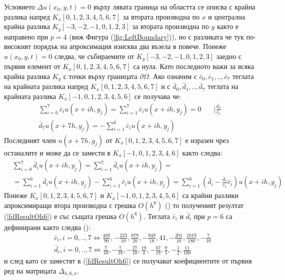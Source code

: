 \documentclass{article}
\newcommand{\rf}[1]{(\ref{#1})}
\begin{document}
Условието $\Delta u(x_0, y, t) = 0$ върху лявата граница на областта се описва с крайна разлика напред $K_x[0,1,2,3,4,5,6,7]$ за втората производна по $x$ и централна крайна разлика $K_y[-3,-2,-1,0,1,2,3]$ за втората производна по $y$ както е направено при $p=4$ (виж Фигура \rf{fig:LeftBoundary}), но с разликата че тук по-високият порядък на апроксимация изисква два възела в повече. Понеже $u(x_0, y, t) = 0$ следва, че събираемите от $K_y[-3,-2,-1,0,1,2,3]$ заедно с първия елемент от $K_x[0,1,2,3,4,5,6,7]$ са нула. Като последното важи за всяка крайна разлика $K_y$ с точки върху границата $\partial \Omega$. Ако означим с $\bar c_0, \bar c_1, .., \bar c_7$ теглата на крайната разлика напред $K_x[0,1,2,3,4,5,6,7]$ и с $\bar d_0, \bar d_1,.., \bar d_7$ теглата на крайната разлика $K_x[-1,0,1,2,3,4,5,6]$ се получава че:
\begin{align}\label{deltaOh6Zero}
\sum\limits_{i=0}^{7} \bar c_i u(x+ih, y_j) = \sum\limits_{i=1}^{7} \bar c_i u(x+ih, y_j) = 0 &  \quad | \frac{\bar d_7}{\bar c_7} \nonumber\\
\bar d_7 u(x+7h, y_j) = -\sum\limits_{i=1}^{6} \bar c_i u(x+ih, y_j) & 
\end{align}
Последният член $u(x+7h, y_j)$ от $K_x[0,1,2,3,4,5,6,7]$ е изразен чрез останалите и може да се замести в $K_x[-1,0,1,2,3,4,6]$ както следва:
\begin{align}\label{fdResultOh6}
&\sum\limits_{i=0}^{7} \bar d_i u(x+ih, y_j) = \sum\limits_{i=1}^{7} \bar d_i u(x+ih, y_j)  =  \\
&= \sum\limits_{i=1}^{6} \bar d_i u(x+ih, y_j) -\sum\limits_{i=1}^{6} \bar c_i u(x+ih, y_j) = \sum\limits_{i=1}^{6} \left( \bar d_i - \frac{\bar d_7}{\bar c_7} \bar c_i \right) u(x+ih, y_j) \nonumber
\end{align}
Понеже $K_x[0,1,2,3,4,5,6,7]$ и $K_x[-1,0,1,2,3,4,5,6]$ са крайни разлики апроксимиращи втора производна с грешка $O(h^6)$ (\cite{forn}) то полученият резултат \rf{fdResultOh6} е със същата грешка $O(h^6)$. Теглата $\bar c_i$ и $\bar d_i$ при $p=6$ са дефинирани както следва (\cite{forn}):
\begin{align}
&\bar c_i, i = 0,..,7 \iff \frac{469}{90}, -\frac{223}{10}, \frac{879}{20}, -\frac{949}{18}, 41, -\frac{201}{10}, \frac{1019}{180}, -\frac{7}{10} \\
&\bar d_i, i = 0,..,7 \iff \frac{7}{10}, -\frac{7}{18}, -\frac{27}{10}, \frac{19}{4}, -\frac{67}{18}, \frac{9}{5}, -\frac{1}{2}, \frac{11}{180}
\end{align}
и след като се заместят в \rf{fdResultOh6} се получават коефициентите от първия ред на матрицата $\Delta_{h,6,x}$. 
\end{document}
